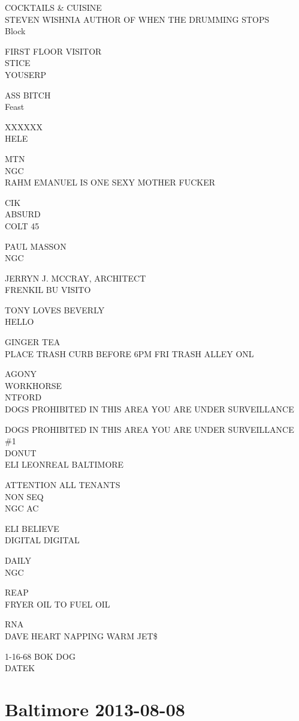 \documentclass[10pt,letterpaper]{article}
\begin{document}
COCKTAILS \& CUISINE\\
STEVEN WISHNIA AUTHOR OF WHEN THE DRUMMING STOPS\\
Block

FIRST FLOOR VISITOR\\
STICE\\
YOUSERP

ASS BITCH\\
Feast

XXXXXX\\
HELE

MTN\\
NGC\\
RAHM EMANUEL IS ONE SEXY MOTHER FUCKER

CIK\\
ABSURD\\
COLT 45

PAUL MASSON\\
NGC

JERRYN J. MCCRAY, ARCHITECT\\
FRENKIL BU VISITO

TONY LOVES BEVERLY\\
HELLO

GINGER TEA\\
PLACE TRASH CURB BEFORE 6PM FRI TRASH ALLEY ONL

AGONY\\
WORKHORSE\\
NTFORD\\
DOGS PROHIBITED IN THIS AREA YOU ARE UNDER SURVEILLANCE

DOGS PROHIBITED IN THIS AREA YOU ARE UNDER SURVEILLANCE\\
\#1\\
DONUT\\
ELI LEONREAL BALTIMORE

ATTENTION ALL TENANTS\\
NON SEQ\\
NGC AC

ELI BELIEVE\\
DIGITAL DIGITAL

DAILY\\
NGC

REAP\\
FRYER OIL TO FUEL OIL

RNA\\
DAVE HEART NAPPING WARM JET\$

1{-}16{-}68 BOK DOG\\
DATEK


\section*{Baltimore 2013-08-08}
\end{document}
